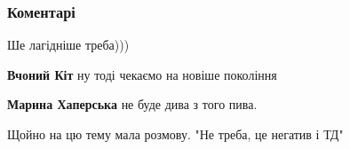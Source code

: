  
 
 
 
 
\subsubsection{Коментарі}

\begin{itemize}
 
Ше лагідніше треба)))

\begin{itemize}
 
\textbf{Вчоний Кіт} ну тоді чекаємо на новіше покоління

 
\textbf{Марина Хаперська} не буде дива з того пива.
\end{itemize}

 
Щойно на цю тему мала розмову. "Не треба, це негатив і ТД"

 


\end{itemize}
